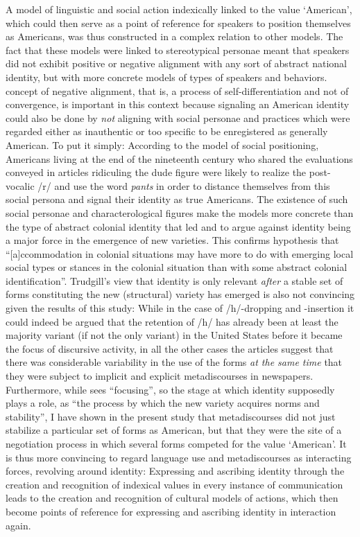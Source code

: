 A model of linguistic and social action indexically linked to the value ‘American’, which could then serve as a point of reference for speakers to position themselves as Americans, was thus constructed in a complex relation to other models. The fact that these models were linked to stereotypical personae meant that speakers did not exhibit positive or negative alignment with any sort of abstract national identity, but with more concrete models of types of speakers and behaviors.  concept of negative alignment, that is, a process of self-differentiation and not of convergence, is important in this context because signaling an American identity could also be done by \emph{not} aligning with social personae and practices which were regarded either as inauthentic or too specific to be enregistered as generally American. To put it simply: According to the model of social positioning, Americans living at the end of the nineteenth century who shared the evaluations conveyed in articles ridiculing the dude figure were likely to realize the post-vocalic /r/ and use the word \emph{pants} in order to distance themselves from this social persona and signal their identity as true Americans. The existence of such social personae and characterological figures make the models more concrete than the type of abstract colonial identity that led \citet{Trudgill2008} and \citet{Mufwene2008} to argue against identity being a major force in the emergence of new varieties. This confirms  hypothesis that “[a]ccommodation in colonial situations may have more to do with emerging local social types or stances in the colonial situation than with some abstract colonial identification”. Trudgill’s view that identity is only relevant \emph{after} a stable set of forms constituting the new (structural) variety has emerged is also not convincing given the results of this study: While in the case of /h/-dropping and -insertion it could indeed be argued that the retention of /h/ has already been at least the majority variant (if not the only variant) in the United States before it became the focus of discursive activity, in all the other cases the articles suggest that there was considerable variability in the use of the forms \emph{at the same time} that they were subject to implicit and explicit metadiscourses in newspapers. Furthermore, while \citet[88]{Trudgill2004} sees “focusing”, so the stage at which identity supposedly plays a role, as “the process by which the new variety acquires norms and stability”, I have shown in the present study that metadiscourses did not just stabilize a particular set of forms as American, but that they were the site of a negotiation process in which several forms competed for the value ‘American’. It is thus more convincing to regard language use and metadiscourses as interacting forces, revolving around identity: Expressing and ascribing identity through the creation and recognition of indexical values in every instance of communication leads to the creation and recognition of cultural models of actions, which then become points of reference for expressing and ascribing identity in interaction again.

